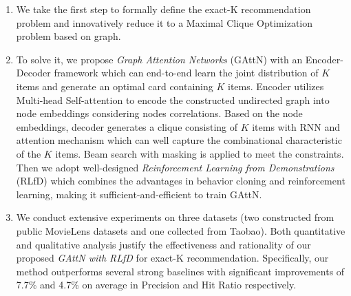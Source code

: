 \begin{enumerate}[(1)]
\item We take the first step to formally define the exact-K recommendation problem and innovatively reduce it to a Maximal Clique Optimization problem based on graph. %
\item %
To solve it, we propose \emph{Graph Attention Networks} (GAttN) with an Encoder-Decoder framework which can end-to-end learn the joint distribution of $K$ items and generate an optimal card containing $K$ items.
Encoder utilizes Multi-head Self-attention to encode the constructed undirected graph into node embeddings considering nodes correlations. Based on the node embeddings, decoder generates a clique consisting of $K$ items with RNN and attention mechanism which can well capture the combinational characteristic of the $K$ items.
Beam search with masking is applied to meet the constraints.
Then we adopt well-designed \emph{Reinforcement Learning from Demonstrations} (RLfD) which combines the advantages in behavior cloning and reinforcement learning, making it sufficient-and-efficient to train GAttN.
\item We conduct extensive experiments on three datasets (two constructed from public MovieLens datasets and one collected from Taobao).
Both quantitative and qualitative analysis justify the effectiveness and rationality of our proposed \emph{GAttN with RLfD} for exact-K recommendation.
Specifically, our method outperforms several strong baselines with significant improvements of 7.7\% and 4.7\% on average in Precision and Hit Ratio respectively. 
\end{enumerate}
